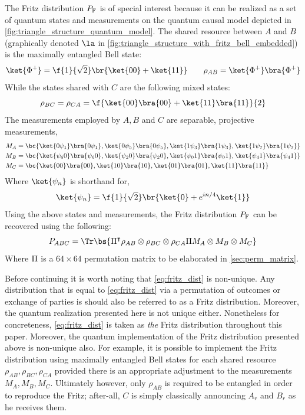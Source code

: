 \documentclass[aps, 10pt, english, twoside, pra, nofootinbib, tightenlines, longbibliography, superscriptaddress]{revtex4-1}
\begin{document}
    The Fritz distribution $\prob[\fritz]$ is of special interest because it can be realized as a set of quantum states and measurements on the quantum causal model depicted in \cref{fig:triangle_structure_quantum_model}. The shared resource between $A$ and $B$ (graphically denoted $\la$ in \cref{fig:triangle_structure_with_fritz_bell_embedded}) is the maximally entangled Bell state:
    \[ \ket{\Phi^+} = \f{1}{\sqrt{2}}\br{\ket{00} + \ket{11}} \qquad \rho_{AB} = \ket{\Phi^+}\bra{\Phi^+} \]
    While the states shared with $C$ are the following mixed states:
    \[ \rho_{BC} = \rho_{CA} = \f{\ket{00}\bra{00} + \ket{11}\bra{11}}{2} \]
    The measurements employed by $A,B$ and $C$ are separable, projective measurements,
    \begin{align*}
        M_{A} &= \bc{\ket{0\psi_{1}}\bra{0\psi_{1}}, \ket{0\psi_{5}}\bra{0\psi_{5}}, \ket{1\psi_{3}}\bra{1\psi_{3}}, \ket{1\psi_{7}}\bra{1\psi_{7}}} \\
        M_{B} &= \bc{\ket{\psi_{6}0}\bra{\psi_{6}0}, \ket{\psi_{2}0}\bra{\psi_{2}0}, \ket{\psi_{0}1}\bra{\psi_{0}1}, \ket{\psi_{4}1}\bra{\psi_{4}1}} \\
        M_{C} &= \bc{\ket{00}\bra{00}, \ket{10}\bra{10}, \ket{01}\bra{01}, \ket{11}\bra{11}}
    \end{align*}
    Where $\ket{\psi_n}$ is shorthand for,
    \[ \ket{\psi_n} = \f{1}{\sqrt{2}}\br{\ket{0} + e^{in/4}\ket{1}} \]
    Using the above states and measurements, the Fritz distribution $\prob[\fritz]$ can be recovered using the following:
    \[ \prob[ABC] = \Tr\bs{\netperm^\intercal \rho_{AB}\otimes\rho_{BC}\otimes\rho_{CA} \netperm M_{A}\otimes M_{B} \otimes M_{C}} \]
    Where $\Pi$ is a $64 \times 64$ permutation matrix to be elaborated in \cref{sec:perm_matrix}.

    Before continuing it is worth noting that \cref{eq:fritz_dist} is non-unique. Any distribution that is equal to \cref{eq:fritz_dist} via a permutation of outcomes or exchange of parties is should also be referred to as a Fritz distribution. Moreover, the quantum realization presented here is not unique either. Nonetheless for concreteness, \cref{eq:fritz_dist} is taken as \textit{the} Fritz distribution throughout this paper. Moreover, the quantum implementation of the Fritz distribution presented above is non-unique also. For example, it is possible to implement the Fritz distribution using maximally entangled Bell states for each shared resource $\rho_{AB}, \rho_{BC}, \rho_{CA}$ provided there is an appropriate adjustment to the measurements $M_A, M_B, M_C$. Ultimately however, only $\rho_{AB}$ is required to be entangled in order to reproduce the Fritz; after-all, $C$ is simply classically announcing $A_r$ and $B_r$ as he receives them.
\end{document}
